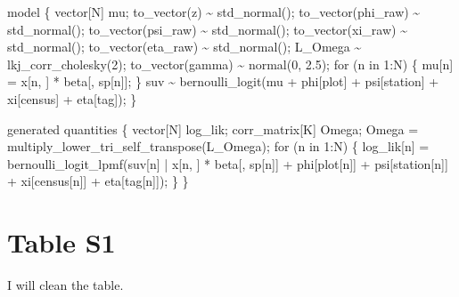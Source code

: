 \documentclass[
  12pt,
  letterpaper,
  DIV=11,
  numbers=noendperiod]{scrartcl}
\newenvironment{Shaded}{\begin{snugshade}}{\end{snugshade}}
\newcommand{\ControlFlowTok}[1]{\textcolor[rgb]{0.00,0.23,0.31}{#1}}
\newcommand{\DataTypeTok}[1]{\textcolor[rgb]{0.68,0.00,0.00}{#1}}
\newcommand{\DecValTok}[1]{\textcolor[rgb]{0.68,0.00,0.00}{#1}}
\newcommand{\FloatTok}[1]{\textcolor[rgb]{0.68,0.00,0.00}{#1}}
\newcommand{\KeywordTok}[1]{\textcolor[rgb]{0.00,0.23,0.31}{#1}}
\newcommand{\NormalTok}[1]{\textcolor[rgb]{0.00,0.23,0.31}{#1}}
\begin{document}
\begin{Shaded}
\begin{Highlighting}[]
\KeywordTok{model}\NormalTok{ \{}
  \DataTypeTok{vector}\NormalTok{[N] mu;}
\NormalTok{  to\_vector(z) \textasciitilde{} std\_normal();}
\NormalTok{  to\_vector(phi\_raw) \textasciitilde{} std\_normal();}
\NormalTok{  to\_vector(psi\_raw) \textasciitilde{} std\_normal();}
\NormalTok{  to\_vector(xi\_raw) \textasciitilde{} std\_normal();}
\NormalTok{  to\_vector(eta\_raw) \textasciitilde{} std\_normal();}
\NormalTok{  L\_Omega \textasciitilde{} lkj\_corr\_cholesky(}\DecValTok{2}\NormalTok{);}
\NormalTok{  to\_vector(gamma) \textasciitilde{} normal(}\DecValTok{0}\NormalTok{, }\FloatTok{2.5}\NormalTok{);}
  \ControlFlowTok{for}\NormalTok{ (n }\ControlFlowTok{in} \DecValTok{1}\NormalTok{:N) \{}
\NormalTok{    mu[n] = x[n, ] * beta[, sp[n]];}
\NormalTok{  \}}
\NormalTok{  suv \textasciitilde{} bernoulli\_logit(mu + phi[plot] + psi[station] + xi[census] + eta[tag]);}
\NormalTok{\}}

\KeywordTok{generated quantities}\NormalTok{ \{}
  \DataTypeTok{vector}\NormalTok{[N] log\_lik;}
  \DataTypeTok{corr\_matrix}\NormalTok{[K] Omega;}
\NormalTok{  Omega = multiply\_lower\_tri\_self\_transpose(L\_Omega);}
  \ControlFlowTok{for}\NormalTok{ (n }\ControlFlowTok{in} \DecValTok{1}\NormalTok{:N) \{}
\NormalTok{    log\_lik[n] = bernoulli\_logit\_lpmf(suv[n] | x[n, ] * beta[, sp[n]] +}
\NormalTok{      phi[plot[n]] + psi[station[n]] + xi[census[n]] + eta[tag[n]]);}
\NormalTok{  \}}
\NormalTok{\}}
\end{Highlighting}
\end{Shaded}

\newpage

\hypertarget{table-s1}{%
\section{Table S1}\label{table-s1}}

I will clean the table.
\end{document}
